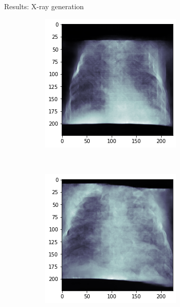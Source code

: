 \begin{frame}{Results: X-ray generation}
\begin{figure}[htbp!]
\begin{subfigure}[b]{0.3\textwidth}
     \end{subfigure}
     \hfill
     \begin{subfigure}[b]{0.3\textwidth}
         \centering
         \includegraphics[width=\textwidth]{Images/xray_sample3.png}
     \end{subfigure}
     \hfill
     \\
     \begin{subfigure}[b]{0.3\textwidth}
         \centering
         \includegraphics[width=\textwidth]{Images/xray_sample4.png}

\end{subfigure}
\end{figure}
\end{frame}
